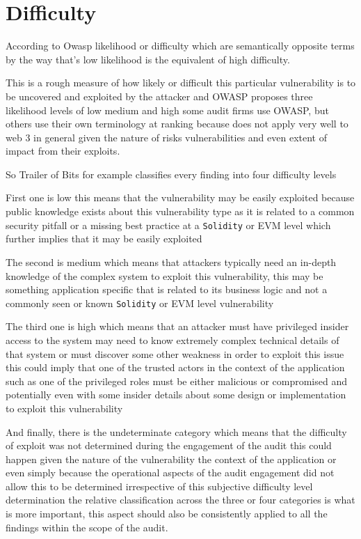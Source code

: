 \section{Difficulty}

According to Owasp likelihood or difficulty which are semantically opposite terms by the way that's low likelihood is the equivalent of high difficulty. 

This is a rough measure of how likely or difficult this particular vulnerability is to be uncovered and exploited by the attacker and OWASP proposes three likelihood levels of low medium and high some audit firms use OWASP, but others use their own terminology at ranking because does not apply very well to web 3 in general given the nature of risks vulnerabilities and even extent of impact from their exploits.

So Trailer of Bits for example classifies every finding into four difficulty levels 

First one is low this means that the vulnerability may be easily exploited because public knowledge exists about this vulnerability type as it is related to a common security pitfall or a missing best practice at a \verb|Solidity| or EVM level which further implies that it may be easily exploited

The second is medium which means that attackers typically need an in-depth knowledge of the complex system to exploit this vulnerability, this may be something application specific that is related to its business logic and not a commonly seen or known \verb|Solidity| or EVM level vulnerability

The third one is high which means that an attacker must have privileged insider access to the system may need to know extremely complex technical details of that system or must discover some other weakness in order to exploit this issue this could imply that one of the trusted actors in the context of the application such as one of the privileged roles must be either malicious or compromised and potentially even with some insider details about some design or implementation to exploit this vulnerability

And finally, there is the undeterminate category which means that the difficulty of exploit was not determined during the engagement of the audit this could happen given the nature of the vulnerability the context of the application or even simply because the operational aspects of the audit engagement did not allow this to be determined irrespective of this subjective difficulty level determination the relative classification across the three or four categories is what is more important, this aspect should also be consistently applied to all the findings within the scope of the audit.

